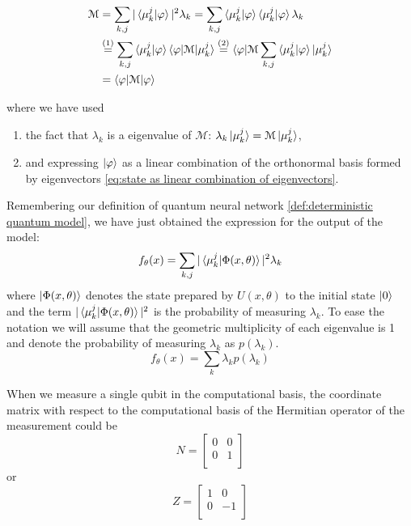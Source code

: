 \begin{align}
    \mathcal{M} &= \sum_{k,j} |\braket{\mu_k^j|\varphi}|^2 \lambda_k = \sum_{k,j} \braket{\mu_k^j|\varphi} \braket{\mu_k^j|\varphi} \lambda_k \\
    &\stackrel{(1)}{=} \sum_{k,j} \braket{\mu_k^j|\varphi} \braket{\varphi | \mathcal{M} | \mu_k^j} \stackrel{(2)}{=} \braket{\varphi | \mathcal{M}\sum_{k,j} \braket{\mu_k^j | \varphi} | \mu_k^j } \\
    &= \braket{\varphi | \mathcal{M} | \varphi}
\end{align}

where we have used 
\begin{enumerate}
    \item the fact that $\lambda_k$ is a eigenvalue of $\mathcal{M}$: $\lambda_k \ket{\mu_k^j} = \mathcal{M}\ket{\mu_k^j}$,
    \item and expressing $\ket{\varphi}$ as a linear combination of the orthonormal basis formed by eigenvectors \eqref{eq:state as linear combination of eigenvectors}.
\end{enumerate}

Remembering our definition of quantum neural network \autoref{def:deterministic quantum model}, we have just obtained the expression for the output of the model:
\begin{equation}
    f_{\theta}(x) = \sum_{k,j} |\braket{\mu_k^j | \Phi(x,\theta)}|^2 \lambda_k
\end{equation}
where $\ket{\Phi(x, \theta)}$ denotes the state prepared by $U(x, \theta)$ to the initial state $\ket{0}$ and the term $|\braket{\mu_k^j | \Phi(x,\theta)}|^2$ is the probability of measuring $\lambda_k$. To ease the notation we will assume that the geometric multiplicity of each eigenvalue is 1 and denote the probability of measuring $\lambda_k$ as $p(\lambda_k)$. 
\begin{equation}
    f_{\theta}(x) = \sum_{k} \lambda_k p(\lambda_k)
\end{equation}

When we measure a single qubit in the computational basis, the coordinate matrix with respect to the computational basis of the Hermitian operator of the measurement could be
$$N = \begin{bmatrix}
0&0\\
0&1\\
\end{bmatrix}$$
or 
 $$ Z= \begin{bmatrix}
1&0\\
0&-1\\
\end{bmatrix}$$


